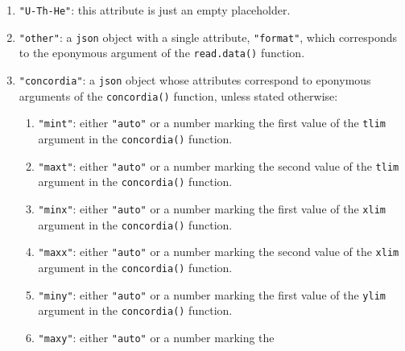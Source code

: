 \begin{refsection}
\begin{enumerate}[leftmargin=\parindent,align=left,
      labelwidth=\parindent,label*=2.\arabic*.]
  attributes:
  \begin{enumerate}[leftmargin=\parindent,align=left,labelwidth=\parindent,label*=\arabic*.]
  \item{\tt "format"}: an integer from 1 to 3, corresponding to the
    eponymous argument of the \texttt{read.data()} function.
  \item{\tt "i2i"}: logical. To be passed on to the eponymous argument
    of \texttt{age()},
  \item{\tt "projerr"}: logical. To be passed on to the eponymous
    argument of the \texttt{age()} function.
  \item{\tt "inverse "}: logical. To be passed on to the eponymous
    argument of the \texttt{isochron()} function,
  \end{enumerate}
\item{\tt "U-Th-He"}: this attribute is just an empty placeholder.
\item{\tt "other"}: a \texttt{json} object with a single attribute,
  \texttt{"format"}, which corresponds to the eponymous argument of
  the \texttt{read.data()} function.
\item{\tt "concordia"}: a \texttt{json} object whose attributes
  correspond to eponymous arguments of the \texttt{concordia()}
  function, unless stated otherwise:
  \begin{enumerate}[leftmargin=\parindent,align=left,
      labelwidth=\parindent,label*=\arabic*.]
    \item{\tt "mint"}: either \texttt{"auto"} or a number marking the
      first value of the \texttt{tlim} argument in the
      \texttt{concordia()} function.
    \item{\tt "maxt"}: either \texttt{"auto"} or a number marking the
      second value of the \texttt{tlim} argument in the
      \texttt{concordia()} function.
    \item{\tt "minx"}: either \texttt{"auto"} or a number marking the
      first value of the \texttt{xlim} argument in the
      \texttt{concordia()} function.
    \item{\tt "maxx"}: either \texttt{"auto"} or a number marking the
      second value of the \texttt{xlim} argument in the
      \texttt{concordia()} function.
    \item{\tt "miny"}: either \texttt{"auto"} or a number marking the
      first value of the \texttt{ylim} argument in the
      \texttt{concordia()} function.
    \item{\tt "maxy"}: either \texttt{"auto"} or a number marking the

\end{enumerate}
\end{enumerate}
\end{refsection}
